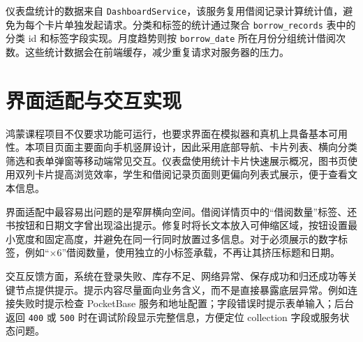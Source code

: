 仪表盘统计的数据来自 \texttt{DashboardService}，该服务复用借阅记录计算统计值，避免为每个卡片单独发起请求。分类和标签的统计通过聚合 \texttt{borrow\_records} 表中的分类 id 和标签字段实现。月度趋势则按 \texttt{borrow\_date} 所在月份分组统计借阅次数。这些统计数据会在前端缓存，减少重复请求对服务器的压力。

\section{界面适配与交互实现}

鸿蒙课程项目不仅要求功能可运行，也要求界面在模拟器和真机上具备基本可用性。本项目页面主要面向手机竖屏设计，因此采用底部导航、卡片列表、横向分类筛选和表单弹窗等移动端常见交互。仪表盘使用统计卡片快速展示概况，图书页使用双列卡片提高浏览效率，学生和借阅记录页面则更偏向列表式展示，便于查看文本信息。

界面适配中最容易出问题的是窄屏横向空间。借阅详情页中的“借阅数量”标签、还书按钮和日期文字曾出现溢出提示。修复时将长文本放入可伸缩区域，按钮设置最小宽度和固定高度，并避免在同一行同时放置过多信息。对于必须展示的数字标签，例如“\(\times 6\)”借阅数量，使用独立的小标签承载，不再让其挤压标题和日期。

交互反馈方面，系统在登录失败、库存不足、网络异常、保存成功和归还成功等关键节点提供提示。提示内容尽量面向业务含义，而不是直接暴露底层异常。例如连接失败时提示检查 PocketBase 服务和地址配置；字段错误时提示表单输入；后台返回 \texttt{400} 或 \texttt{500} 时在调试阶段显示完整信息，方便定位 collection 字段或服务状态问题。
